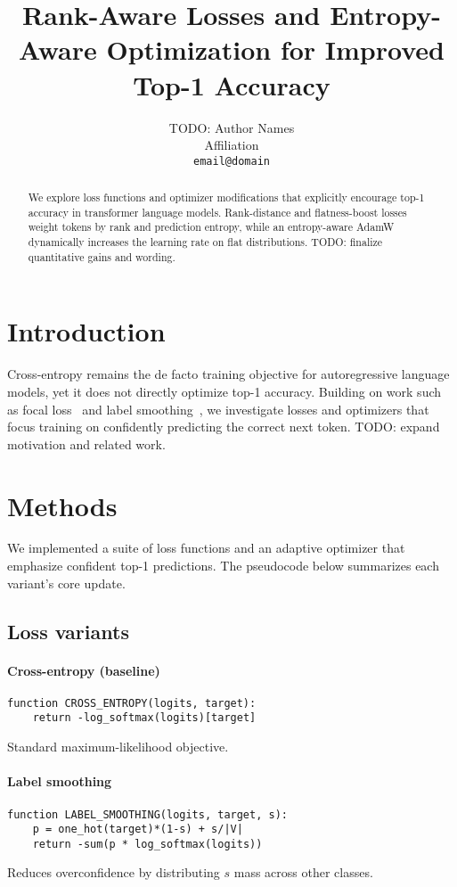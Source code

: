 \documentclass{article}
\title{Rank-Aware Losses and Entropy-Aware Optimization for Improved Top-1 Accuracy}
\author{TODO: Author Names\\Affiliation\\\texttt{email@domain}}
\begin{document}
\maketitle

\begin{abstract}
We explore loss functions and optimizer modifications that explicitly encourage top-1 accuracy in transformer language models. Rank-distance and flatness-boost losses weight tokens by rank and prediction entropy, while an entropy-aware AdamW dynamically increases the learning rate on flat distributions. TODO: finalize quantitative gains and wording.
\end{abstract}

\section{Introduction}
Cross-entropy remains the de facto training objective for autoregressive language models, yet it does not directly optimize top-1 accuracy. Building on work such as focal loss~\cite{lin2017focal} and label smoothing~\cite{szegedy2016rethinking}, we investigate losses and optimizers that focus training on confidently predicting the correct next token. TODO: expand motivation and related work.

\section{Methods}
We implemented a suite of loss functions and an adaptive optimizer that emphasize confident top-1 predictions. The pseudocode below summarizes each variant's core update.

\subsection{Loss variants}

\paragraph{Cross-entropy (baseline)}
\begin{lstlisting}
function CROSS_ENTROPY(logits, target):
    return -log_softmax(logits)[target]
\end{lstlisting}
Standard maximum-likelihood objective.

\paragraph{Label smoothing}
\begin{lstlisting}
function LABEL_SMOOTHING(logits, target, s):
    p = one_hot(target)*(1-s) + s/|V|
    return -sum(p * log_softmax(logits))
\end{lstlisting}
Reduces overconfidence by distributing $s$ mass across other classes.
\end{document}
